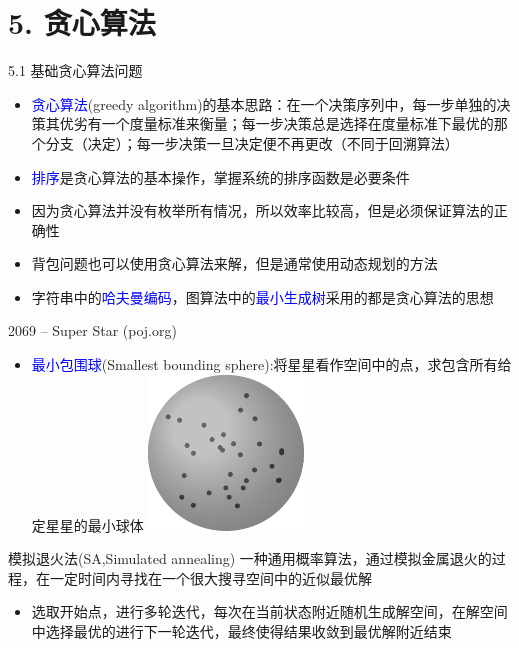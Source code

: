 


\frame{\titlepage}
\section{5. 贪心算法}
\begin{frame}{5.1 基础贪心算法问题}
    \begin{itemize}
        \item \textcolor{blue}{贪心算法}(greedy algorithm)的基本思路：在一个决策序列中，每一步单独的决策其优劣有一个度量标准来衡量；每一步决策总是选择在度量标准下最优的那个分支（决定）；每一步决策一旦决定便不再更改（不同于回溯算法）
        \item \textcolor{blue}{排序}是贪心算法的基本操作，掌握系统的排序函数是必要条件
        \item 因为贪心算法并没有枚举所有情况，所以效率比较高，但是必须保证算法的正确性
        \item 背包问题也可以使用贪心算法来解，但是通常使用动态规划的方法
        \item 字符串中的\textcolor{blue}{哈夫曼编码}，图算法中的\textcolor{blue}{最小生成树}采用的都是贪心算法的思想
    \end{itemize}
\end{frame}
\begin{frame}{2069 -- Super Star (poj.org)}
    \begin{itemize}
        \item \textcolor{blue}{最小包围球}(Smallest bounding sphere):将星星看作空间中的点，求包含所有给定星星的最小球体
        \includegraphics[center]{fig/5-1.pdf}
    \end{itemize}
    \begin{block}{模拟退火法(SA,Simulated annealing)}
        \quad 一种通用概率算法，通过模拟金属退火的过程，在一定时间内寻找在一个很大搜寻空间中的近似最优解
    \end{block}
    \begin{itemize}
        \item 选取开始点，进行多轮迭代，每次在当前状态附近随机生成解空间，在解空间中选择最优的进行下一轮迭代，最终使得结果收敛到最优解附近结束
    \end{itemize}
\end{frame}
